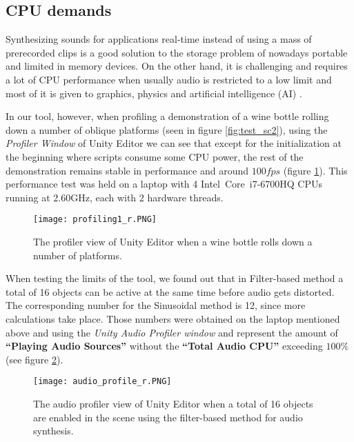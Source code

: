 \subsection{CPU demands}
Synthesizing sounds for applications real-time instead of using a mass of prerecorded clips is a good solution to the storage problem of nowadays portable and limited in memory devices. On the other hand, it is challenging and requires a lot of CPU performance when usually audio is restricted to a low limit and most of it is given to graphics, physics and artificial intelligence (AI) \cite{lloyd2011sound}. 

In our tool, however, when profiling a demonstration of a wine bottle rolling down a number of oblique platforms (seen in figure \ref{fig:test_sc2}), using the \textit{Profiler Window} of Unity Editor we can see that except for the initialization at the beginning where scripts consume some CPU power, the rest of the demonstration remains stable in performance and around $100 fps$ (figure \ref{fig:profile}). This performance test was held on a laptop with 4 Intel\textregistered\ Core\texttrademark\ i7-6700HQ CPUs running at 2.60GHz, each with 2 hardware threads.

\begin{figure}[H]
  \centering
    \texttt{[image: profiling1\_r.PNG]}
      \caption{The profiler view of Unity Editor when a wine bottle rolls down a number of platforms.}
      \label{fig:profile}
\end{figure} 

When testing the limits of the tool, we found out that in Filter-based method a total of 16 objects can be active at the same time before audio gets distorted. The corresponding number for the Sinusoidal method is 12, since more calculations take place. Those numbers were obtained on the laptop mentioned above and using the \textit{Unity Audio Profiler window} and represent the amount of \textbf{``Playing Audio Sources''} without the \textbf{``Total Audio CPU''} exceeding $100\%$ (see figure \ref{fig:audio_profile}).

\begin{figure}[H]
  \centering
    \texttt{[image: audio\_profile\_r.PNG]}
      \caption{The audio profiler view of Unity Editor when a total of 16 objects are enabled in the scene using the filter-based method for audio synthesis.}
      \label{fig:audio_profile}
\end{figure}

